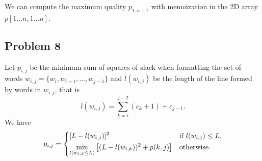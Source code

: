 \documentclass{article}
\begin{document}
We can compute the maximum quality $p_{1, n + 1}$ with memoization in the 2D array $p[1\dots n, 1\dots n]$.

\subsection*{Problem 8}

Let $p_{i, j}$ be the minimum sum of squares of slack when formatting the set of words $w_{i, j} = \{w_i, w_{i + 1}, \dots, w_{j - 1}\}$ and $l(w_{i, j})$ be the length of the line formed by words in $w_{i, j}$, that is
\[
    l(w_{i, j}) = \sum_{k = i}^{j - 2} (c_k + 1) + c_{j - 1}.
\]
We have
\[
    p_{i, j} = \begin{dcases*}
        [L - l(w_{i, j})]^2 & if $l(w_{i, j}) \le L$,\\
        \min_{l(w_{i, k} \le L)} \left[(L - l(w_{i, k}))^2 + p(k, j)\right] & otherwise.
    \end{dcases*}
\]
\end{document}
